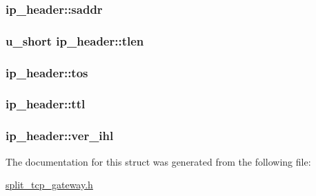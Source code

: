 \hypertarget{structip__header_a7171ecc414f6c8c972fe2e70fb189bc3}{
\subsubsection[{saddr}]{ {\bf ip\-\_\-header\-::saddr}}}\label{structip__header_a7171ecc414f6c8c972fe2e70fb189bc3}
\hypertarget{structip__header_a551538f84a5cdac3e0accc9551c22793}{
\subsubsection[{tlen}]{\setlength{\rightskip}{0pt plus 5cm}u\-\_\-short {\bf ip\-\_\-header\-::tlen}}}\label{structip__header_a551538f84a5cdac3e0accc9551c22793}
\hypertarget{structip__header_a14c3d2a74ce954f35be8c4353122c188}{
\subsubsection[{tos}]{ {\bf ip\-\_\-header\-::tos}}}\label{structip__header_a14c3d2a74ce954f35be8c4353122c188}
\hypertarget{structip__header_aefda609a054b2e0442ec676317ba5650}{
\subsubsection[{ttl}]{ {\bf ip\-\_\-header\-::ttl}}}\label{structip__header_aefda609a054b2e0442ec676317ba5650}
\hypertarget{structip__header_a5eb344fea96865ef5757d712a23274b4}{
\subsubsection[{ver\-\_\-ihl}]{ {\bf ip\-\_\-header\-::ver\-\_\-ihl}}}\label{structip__header_a5eb344fea96865ef5757d712a23274b4}


\-The documentation for this struct was generated from the following file\-:\begin{DoxyCompactItemize}
\item 
\hyperlink{split__tcp__gateway_8h}{split\-\_\-tcp\-\_\-gateway.\-h}\end{DoxyCompactItemize}
